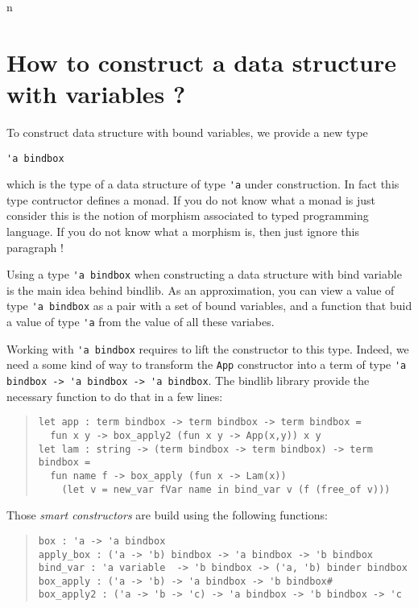 \documentclass[11pt]{article}
\begin{document}
n\section{How to construct a data structure with variables ?}

To construct data structure with bound variables, we provide a new type
\begin{center}
\verb!'a bindbox!
\end{center}

which is the type of a data structure of type \verb#'a# under
construction.
In fact this type contructor defines a monad. If you do not know what
a monad is just consider this is the notion of morphism associated to
typed programming language. If you do not know what a morphism is,
then just ignore this paragraph !

Using a type \verb!'a bindbox! when constructing a data structure with
bind variable is the main idea behind bindlib. As an approximation,
you can view a value of type \verb!'a bindbox! as a pair with a set
of bound variables, and a function that buid a value of type \verb!'a!
from the value of all these variabes.

Working with \verb!'a bindbox! requires to lift the constructor to
this type. Indeed, we need a some kind of way to transform the
\verb!App! constructor into a term of type
\verb!'a bindbox -> 'a bindbox -> 'a bindbox!. The bindlib library
provide the necessary function to do that in a few lines:

\begin{quote}
\begin{verbatim}
let app : term bindbox -> term bindbox -> term bindbox =
  fun x y -> box_apply2 (fun x y -> App(x,y)) x y
let lam : string -> (term bindbox -> term bindbox) -> term bindbox =
  fun name f -> box_apply (fun x -> Lam(x))
    (let v = new_var fVar name in bind_var v (f (free_of v)))
\end{verbatim}
\end{quote}

Those \emph{smart constructors} are build using the following functions:
\begin{quote}
\begin{verbatim}
box : 'a -> 'a bindbox
apply_box : ('a -> 'b) bindbox -> 'a bindbox -> 'b bindbox
bind_var : 'a variable  -> 'b bindbox -> ('a, 'b) binder bindbox
box_apply : ('a -> 'b) -> 'a bindbox -> 'b bindbox#
box_apply2 : ('a -> 'b -> 'c) -> 'a bindbox -> 'b bindbox -> 'c
\end{verbatim}
\end{quote}
\end{document}
